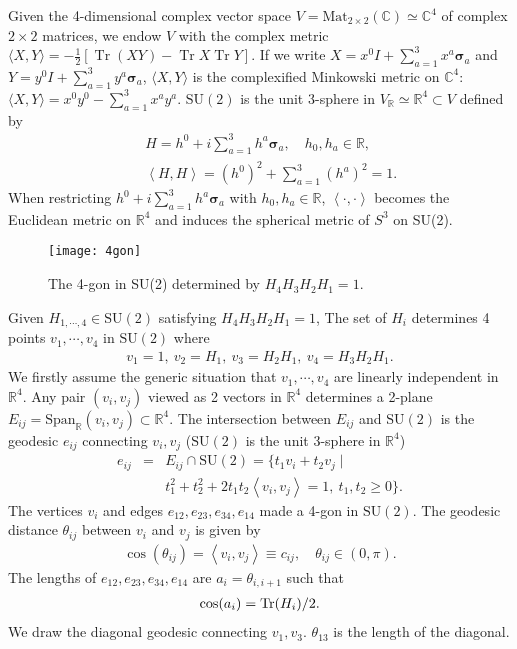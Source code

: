 \documentclass[aps,prd,notitlepage,nofootinbib,superscriptaddress,groupedaddress,twocolumn]{revtex4-1}
\def\C{\mathbb{C}}
\def\R{\mathbb{R}}
\newcommand{\Slc}{\mathrm{SL}(2,\mathbb{C})}
\newcommand{\Su}{\mathrm{SU}(2)}
\def\be{\begin{eqnarray}}
\def\ee{\end{eqnarray}}
\newcommand{\lt}{\left}
\newcommand{\rt}{\right}
\newcommand{\lag}{\left\langle}
\newcommand{\rag}{\right\rangle}
\begin{document}
Given the 4-dimensional complex vector space $V=\mathrm{Mat}_{2\times 2}(\C)\simeq\C^4$ of complex $2\times 2$ matrices, we endow $V$ with the complex metric $\langle X, Y\rangle=-\frac{1}{2}\lt[\operatorname{Tr}(X Y)-\operatorname{Tr} X \operatorname{Tr} Y\rt]$. If we write $X=x^0 I+\sum_{a=1}^3x^a\bm{\sigma}_a$ and $Y=y^0 I+\sum_{a=1}^3y^a\bm{\sigma}_a$, $\langle X,Y\rangle$ is the complexified Minkowski metric on $\C^4$: $\langle X, Y\rangle=x^0y^0-\sum_{a=1}^3x^ay^a$. 
$\Su$ is the unit 3-sphere in $V_{\R}\simeq\R^4\subset V$ defined by 
\be
&&H=h^0+i\sum_{a=1}^3 h^a\bm{\sigma}_a,\quad h_0,h_a\in\R,\nonumber\\
&&\lag H,H\rag=(h^0)^2+\sum_{a=1}^3(h^a)^2=1.\nonumber
\ee
When restricting $h^0+i\sum_{a=1}^3 h^a\bm{\sigma}_a$ with $h_0,h_a\in\R$, $\lag\cdot,\cdot\rag$ becomes the Euclidean metric on $\R^4$ and induces the spherical metric of $S^3$ on SU(2). 


\begin{figure}[h]
	\begin{center}
	\texttt{[image: 4gon]}
	\caption{The 4-gon in SU(2) determined by $H_4H_3H_2H_1=1$.}
	\label{4gon}
	\end{center}
	\end{figure}


Given $H_{1,\cdots,4}\in\Su$ satisfying $H_4H_3H_2H_1=1$, The set of $H_i$ determines 4 points $v_1,\cdots,v_4$ in $\Su$ where
\be
v_1=1,\ v_2= H_1,\ v_3=H_2H_1,\ v_4=H_3H_2H_1.\nonumber
\ee
We firstly assume the generic situation that $v_1,\cdots,v_4$ are linearly independent in $\R^4$. Any pair $(v_i,v_j)$ viewed as 2 vectors in $\R^4$ determines a 2-plane $E_{ij}=\mathrm{Span}_\R(v_i,v_j)\subset \R^4$. The intersection between $E_{ij}$ and $\Su$ is the geodesic $e_{ij}$ connecting $v_i,v_j$ ($\Su$ is the unit 3-sphere in $\R^4$)
\be
e_{ij}&=&E_{ij}\cap \Su=\{t_1v_i+t_2v_j\mid \nonumber\\
&&t_1^2+t_2^2+2t_1t_2\lag v_i,v_j\rag=1,\ t_1,t_2\geq0\}.\nonumber
\ee
The vertices $v_i$ and edges $e_{12},e_{23},e_{34},e_{14}$ made a 4-gon in $\Su$. The geodesic distance $\theta_{ij}$ between $v_i$ and $v_j$ is given by
\be
\cos(\theta_{ij})=\lag v_i,v_j\rag\equiv c_{ij},\quad \theta_{ij}\in(0,\pi).\nonumber
\ee
The lengths of $e_{12},e_{23},e_{34},e_{14}$ are $a_i=\theta_{i,i+1}$ such that
\be
\cos(a_i)=\Tr(H_i)/2.\nonumber
\ee 
We draw the diagonal geodesic connecting $v_{1},v_3$. $\theta_{13}$ is the length of the diagonal.
\end{document}
